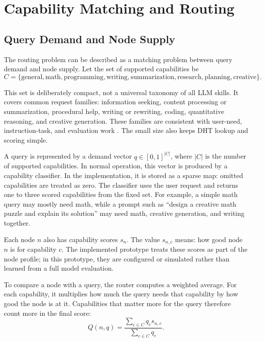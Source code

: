 \section{Capability Matching and Routing}

\subsection{Query Demand and Node Supply}

The routing problem can be described as a matching problem between query demand
and node supply. Let the set of supported capabilities be
\[
  C = \{\text{general}, \text{math}, \text{programming}, \text{writing},
  \text{summarization}, \text{research}, \text{planning}, \text{creative}\}.
\]

This set is deliberately compact, not a universal taxonomy of all LLM skills.
It covers common request families: information seeking, content processing or
summarization, procedural help, writing or rewriting, coding, quantitative
reasoning, and creative generation. These families are consistent with
user-need, instruction-task, and evaluation work
\citep{shelby2025tuna,wang2022supernaturalinstructions,liang2022helm}. The
small size also keeps DHT lookup and scoring simple.

A query is represented by a demand vector \(q \in [0,1]^{|C|}\), where
\(|C|\) is the number of supported capabilities. In normal operation, this
vector is produced by a capability classifier. In the implementation, it is
stored as a sparse map: omitted capabilities are treated as zero. The
classifier uses the user request and returns one to three scored capabilities
from the fixed set. For example, a simple math query may mostly need math,
while a prompt such as ``design a creative math puzzle and explain its
solution'' may need math, creative generation, and writing together.

Each node \(n\) also has capability scores \(s_n\). The value \(s_{n,c}\) means:
how good node \(n\) is for capability \(c\). The implemented prototype treats
these scores as part of the node profile; in this prototype, they are configured
or simulated rather than learned from a full model evaluation.

To compare a node with a query, the router computes a weighted average. For
each capability, it multiplies how much the query needs that capability by how
good the node is at it. Capabilities that matter more for the query therefore
count more in the final score:
\[
  Q(n, q) =
  \frac{\sum_{c \in C} q_c s_{n,c}}{\sum_{c \in C} q_c}.
\]

